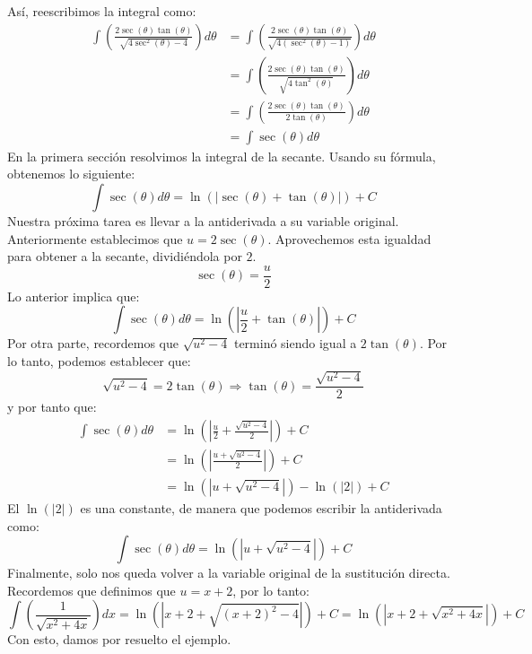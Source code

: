 \documentclass[12pt]{article}
\begin{document}
Así, reescribimos la integral como:
\begin{align*}
\int \left(\frac{2\sec(\theta)\tan(\theta)}{\sqrt{4\sec^{2}(\theta) - 4}}\right) d\theta &=
  \int \left(\frac{2\sec(\theta)\tan(\theta)}{\sqrt{4(\sec^{2}(\theta) - 1)}}\right) d\theta \\
  &= \int \left(\frac{2\sec(\theta)\tan(\theta)}{\sqrt{4\tan^{2}(\theta)}}\right) d\theta \\
  &= \int \left(\frac{2\sec(\theta)\tan(\theta)}{2\tan(\theta)}\right) d\theta \\
  &= \int \sec(\theta) d\theta
\end{align*}
En la primera sección resolvimos la integral de la secante. Usando su fórmula, obtenemos lo siguiente:
\[
  \int \sec(\theta) d\theta = \ln(|\sec(\theta) + \tan(\theta)|) + C
\]
Nuestra próxima tarea es llevar a la antiderivada a su variable original. Anteriormente establecimos que $u = 2\sec(\theta)$. Aprovechemos esta igualdad para obtener a la secante, dividiéndola por $2$.
\[
  \sec(\theta) = \frac{u}{2}
\]
Lo anterior implica que:
\[
  \int \sec(\theta) d\theta = \ln\left(\left|\frac{u}{2} + \tan(\theta)\right|\right) + C
\]
Por otra parte, recordemos que $\sqrt{u^{2} - 4}$ terminó siendo igual a $2\tan(\theta)$. Por lo tanto, podemos establecer que:
\[
  \sqrt{u^{2} - 4} = 2\tan(\theta) \Longrightarrow \tan(\theta) = \frac{\sqrt{u^{2} - 4}}{2}
\]
y por tanto que:
\begin{align*}
  \int \sec(\theta) d\theta &= \ln\left(\left|\frac{u}{2} + \frac{\sqrt{u^{2} - 4}}{2}\right|\right) + C \\
                            &= \ln\left(\left|\frac{u + \sqrt{u^{2} - 4}}{2}\right|\right) + C \\
                            &= \ln(|u + \sqrt{u^{2} - 4}|) - \ln(|2|) + C
\end{align*}
El $\ln(|2|)$ es una constante, de manera que podemos escribir la antiderivada como:
\[
  \int \sec(\theta) d\theta  = \ln(|u + \sqrt{u^{2} - 4}|) + C
\]
Finalmente, solo nos queda volver a la variable original de la sustitución directa. Recordemos que definimos que $u = x + 2$, por lo tanto:
\[
  \int \left(\frac{1}{\sqrt{x^{2} + 4x}}\right) dx = \ln(|x + 2 + \sqrt{(x + 2)^{2} - 4}|) + C = \ln(|x + 2 + \sqrt{x^{2} + 4x}|) + C
\]
Con esto, damos por resuelto el ejemplo.
\end{document}
